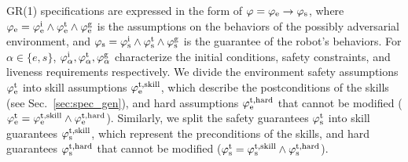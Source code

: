 \documentclass[letterpaper, 10 pt, conference]{ieeeconf}
\begin{document}
GR(1) specifications are expressed in the form of 
$\varphi = \varphi_\textrm{e} \to \varphi_\textrm{s}$,
where $\varphi_\textrm{e} = \varphi_\textrm{e}^\textrm{i} \land \varphi_\textrm{e}^\textrm{t} \land \varphi_\textrm{e}^\textrm{g}$ 
is the assumptions on the behaviors of the possibly adversarial environment,
and $\varphi_\textrm{s} = \varphi_\textrm{s}^\textrm{i} \land \varphi_\textrm{s}^\textrm{t} \land \varphi_\textrm{s}^\textrm{g}$
is the guarantee of the robot's behaviors.
For $\alpha \in \{e, s\}$,
$\varphi_\alpha^\textrm{i}, \varphi_\alpha^\textrm{t}, \varphi_\alpha^\textrm{g}$
characterize the 
initial conditions,
safety constraints,
and liveness requirements
respectively.
%
We divide the environment safety assumptions $\varphi_\textrm{e}^\textrm{t}$ into skill assumptions $\varphi_\textrm{e}^\textrm{t,skill}$,
which describe the postconditions of the skills (see Sec.~\ref{sec:spec_gen}),
and hard assumptions $\varphi_\textrm{e}^\textrm{t,hard}$ that cannot be modified
($\varphi_\textrm{e}^\textrm{t} = \varphi_\textrm{e}^\textrm{t,skill} \land \varphi_\textrm{e}^\textrm{t,hard}$).
Similarly, we split the safety guarantees $\varphi_\textrm{s}^\textrm{t}$ into skill guarantees $\varphi_\textrm{s}^\textrm{t,skill}$,
which represent the preconditions of the skills,
and hard guarantees $\varphi_\textrm{s}^\textrm{t,hard}$ that cannot be modified
($\varphi_\textrm{s}^\textrm{t} = \varphi_\textrm{s}^\textrm{t,skill} \land \varphi_\textrm{s}^\textrm{t,hard}$).





\end{document}
